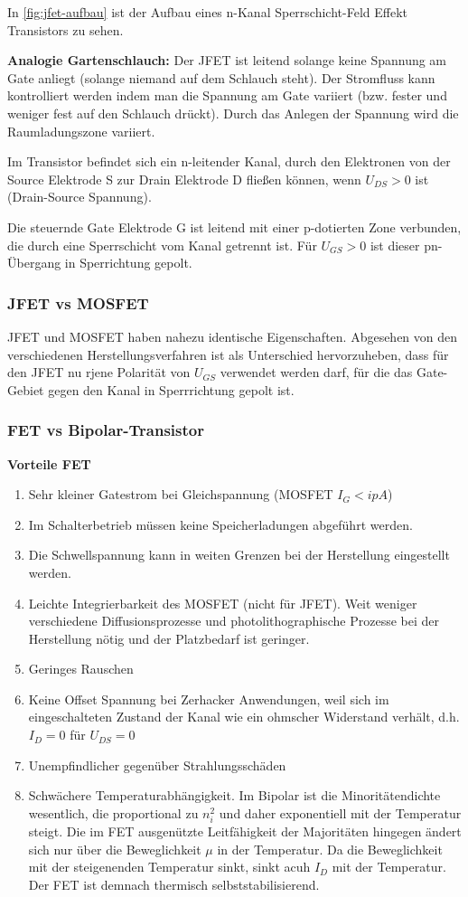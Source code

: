 In \autoref{fig:jfet-aufbau} ist der Aufbau eines n-Kanal Sperrschicht-Feld Effekt Transistors zu sehen. 

\textbf{Analogie Gartenschlauch:} Der JFET ist leitend solange keine Spannung am Gate anliegt (solange niemand auf dem Schlauch steht). Der Stromfluss kann kontrolliert werden indem man die Spannung am Gate variiert (bzw. fester und weniger fest auf den Schlauch drückt). Durch das Anlegen der Spannung wird die Raumladungszone variiert. 

Im Transistor befindet sich ein n-leitender Kanal, durch den Elektronen von der Source Elektrode S zur Drain Elektrode D fließen können, wenn $U_{DS} > 0$ ist (Drain-Source Spannung).

Die steuernde Gate Elektrode G ist leitend mit einer p-dotierten Zone verbunden, die durch eine Sperrschicht vom Kanal getrennt ist. 
Für $U_{GS} > 0$ ist dieser pn-Übergang in Sperrichtung gepolt.

\subsubsection{JFET vs MOSFET}
JFET und MOSFET haben nahezu identische Eigenschaften. Abgesehen von den verschiedenen Herstellungsverfahren ist als Unterschied hervorzuheben, dass für den JFET nu rjene Polarität von $U_{GS} $ verwendet werden darf, für die das Gate-Gebiet gegen den Kanal in Sperrrichtung gepolt ist. 

\subsubsection{FET vs Bipolar-Transistor}

\textbf{Vorteile FET}
\begin{enumerate}
    \item Sehr kleiner Gatestrom bei Gleichspannung (MOSFET $I_G < ipA$)
    \item Im Schalterbetrieb müssen keine Speicherladungen abgeführt werden. 
    \item Die Schwellspannung kann in weiten Grenzen bei der Herstellung eingestellt werden.
    \item Leichte Integrierbarkeit des MOSFET (nicht für JFET). Weit weniger verschiedene Diffusionsprozesse und photolithographische Prozesse bei der Herstellung nötig und der Platzbedarf ist geringer.
    \item Geringes Rauschen
    \item Keine Offset Spannung bei Zerhacker Anwendungen, weil sich im eingeschalteten Zustand der Kanal wie ein ohmscher Widerstand verhält, d.h. $I_D=0$ für $U_{DS} = 0$
    \item Unempfindlicher gegenüber Strahlungsschäden
    \item Schwächere Temperaturabhängigkeit. Im Bipolar ist die Minoritätendichte wesentlich, die proportional zu $n_i^2$ und daher exponentiell mit der Temperatur steigt. Die im FET ausgenützte Leitfähigkeit der Majoritäten hingegen ändert sich nur über die Beweglichkeit $\mu$ in der Temperatur. Da die Beweglichkeit mit der steigenenden Temperatur sinkt, sinkt acuh $I_D$ mit der Temperatur. Der FET ist demnach thermisch selbststabilisierend.
\end{enumerate}

